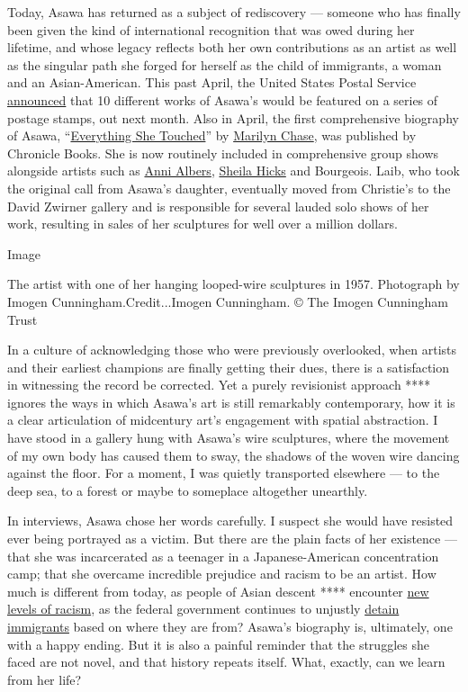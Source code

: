 Today, Asawa has returned as a subject of rediscovery --- someone who
has finally been given the kind of international recognition that was
owed during her lifetime, and whose legacy reflects both her own
contributions as an artist as well as the singular path she forged for
herself as the child of immigrants, a woman and an Asian-American. This
past April, the United States Postal Service
\href{https://ruthasawa.com/usps-announces-2020-ruth-asawa-stamp/}{announced}
that 10 different works of Asawa's would be featured on a series of
postage stamps, out next month. Also in April, the first comprehensive
biography of Asawa,
``\href{https://www.chroniclebooks.com/products/everything-she-touched}{Everything
She Touched}'' by \href{https://www.marilynchase.com/}{Marilyn Chase},
was published by Chronicle Books. She is now routinely included in
comprehensive group shows alongside artists such as
\href{https://www.nytimes.com/1994/05/10/obituaries/anni-albers-94-textile-artist-and-the-widow-of-josef-albers.html}{Anni
Albers},
\href{https://www.nytimes.com/2017/05/03/arts/design/sheila-hicks-work-on-the-high-line.html}{Sheila
Hicks} and Bourgeois. Laib, who took the original call from Asawa's
daughter, eventually moved from Christie's to the David Zwirner gallery
and is responsible for several lauded solo shows of her work, resulting
in sales of her sculptures for well over a million dollars.

Image

The artist with one of her hanging looped-wire sculptures in 1957.
Photograph by Imogen Cunningham.Credit...Imogen Cunningham. © The Imogen
Cunningham Trust

In a culture of acknowledging those who were previously overlooked, when
artists and their earliest champions are finally getting their dues,
there is a satisfaction in witnessing the record be corrected. Yet a
purely revisionist approach **** ignores the ways in which Asawa's art
is still remarkably contemporary, how it is a clear articulation of
midcentury art's engagement with spatial abstraction. I have stood in a
gallery hung with Asawa's wire sculptures, where the movement of my own
body has caused them to sway, the shadows of the woven wire dancing
against the floor. For a moment, I was quietly transported elsewhere ---
to the deep sea, to a forest or maybe to someplace altogether unearthly.

In interviews, Asawa chose her words carefully. I suspect she would have
resisted ever being portrayed as a victim. But there are the plain facts
of her existence --- that she was incarcerated as a teenager in a
Japanese-American concentration camp; that she overcame incredible
prejudice and racism to be an artist. How much is different from today,
as people of Asian descent **** encounter
\href{https://www.nytimes.com/2020/06/24/us/asian-american-racism-coronavirus-kelly-yang.html}{new
levels of racism}, as the federal government continues to unjustly
\href{https://www.nytimes.com/topic/subject/immigration-detention}{detain
immigrants} based on where they are from? Asawa's biography is,
ultimately, one with a happy ending. But it is also a painful reminder
that the struggles she faced are not novel, and that history repeats
itself. What, exactly, can we learn from her life?

